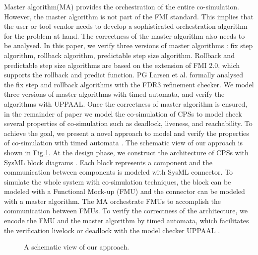 Master algorithm(MA) \cite{AckerDVM15} provides the orchestration of the entire co-simulation. However, the master algorithm is not part of the FMI standard. This implies that the user or tool vendor needs to develop a sophisticated orchestration algorithm for the problem at hand. The correctness of the master algorithm also needs to be analysed. In this paper, we verify three versions of master algorithms \cite{BromanBGLMTW13}: fix step algorithm, rollback algorithm, predictable step size algorithm. Rollback and predictable step size algorithms are based on the extension of FMI 2.0, which supports the rollback and predict function. PG Larsen et al. \cite{Larsen2016Integrated} 
formally analysed the fix step and rollback algorithms with the FDR3 refinement checker. We model three versions of master algorithms with timed automata, and verify the algorithms with UPPAAL. Once the correctness of master algorithm is ensured, in the remainder of paper we model the co-simulation of CPSs to model check several properties of co-simulation such as deadlock, liveness, and reachability. 
To achieve the goal, we present a novel approach to model and verify the properties of co-simulation with timed automata \cite{AlurD94}. The schematic view of our approach is shown in Fig.\ref{paper-arc}.
At the design phase, we construct the architecture of CPSs with SysML block diagrams \cite{RahimHI17}. Each block represents a component and the communication between components is modeled with SysML connector. To simulate the whole system with co-simulation techniques, the block can be modeled with a Functional Mock-up (FMU) and the connector can be modeled with a master algorithm. The MA orchestrate FMUs to accomplish the communication between FMUs. To verify the correctness of the architecture, we encode the FMU and the master algorithm by timed automata, which facilitates the verification livelock or deadlock with the model checker UPPAAL \cite{BehrmannDLHPYH06}.
\begin{figure}[htbp]
	\caption{A schematic view of our approach.}
	\label{paper-arc}
\end{figure}

